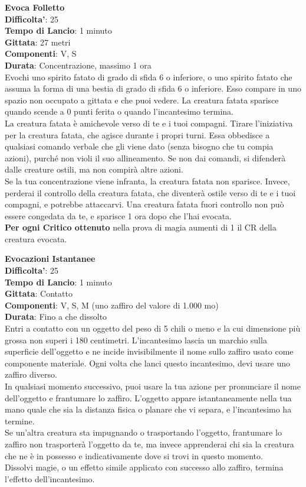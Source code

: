 \begin{multicols}{2}
\medskip\textbf{Evoca Folletto}\\
\textbf{Difficolta'}: 25\\
\textbf{Tempo di Lancio}: 1 minuto\\
\textbf{Gittata}: 27 metri\\
\textbf{Componenti}: V, S\\
\textbf{Durata}: Concentrazione, massimo 1 ora \\
Evochi uno spirito fatato di grado di sfida 6 o inferiore, o uno spirito fatato che assuma la forma di una bestia di grado di sfida 6 o inferiore. Esso compare in uno spazio non occupato a gittata e che puoi vedere. La creatura fatata sparisce quando scende a 0 punti ferita o quando l’incantesimo termina.\\
La creatura fatata è amichevole verso di te e i tuoi compagni. Tirare l’iniziativa per la creatura fatata, che agisce durante i propri turni. Essa obbedisce a qualsiasi comando verbale che gli viene dato (senza bisogno che tu compia azioni), purché non violi il suo allineamento. Se non dai comandi, si difenderà dalle creature ostili, ma non compirà altre azioni.\\
Se la tua concentrazione viene infranta, la creatura fatata non sparisce. Invece, perderai il controllo della creatura fatata, che diventerà ostile verso di te e i tuoi compagni, e potrebbe attaccarvi. Una creatura fatata fuori controllo non può essere congedata da te, e sparisce 1 ora dopo che l’hai evocata.\\
\textbf{Per ogni Critico ottenuto} nella prova di magia aumenti di 1 il CR della creatura evocata.

\medskip\textbf{Evocazioni Istantanee}\\
\textbf{Difficolta'}: 25\\
\textbf{Tempo di Lancio}: 1 minuto\\
\textbf{Gittata}: Contatto\\
\textbf{Componenti}: V, S, M (uno zaffiro del valore di 1.000 mo)\\
\textbf{Durata}: Fino a che dissolto \\
Entri a contatto con un oggetto del peso di 5 chili o meno e la cui dimensione più grossa non superi i 180 centimetri. L’incantesimo lascia un marchio sulla superficie dell’oggetto e ne incide invisibilmente il nome sullo zaffiro usato come componente materiale. Ogni volta che lanci questo incantesimo, devi usare uno zaffiro diverso.\\
In qualsiasi momento successivo, puoi usare la tua azione per pronunciare il nome dell’oggetto e frantumare lo zaffiro. L’oggetto appare istantaneamente nella tua mano quale che sia la distanza fisica o planare che vi separa, e l’incantesimo ha termine.\\
Se un’altra creatura sta impugnando o trasportando l’oggetto, frantumare lo zaffiro non trasporterà l’oggetto da te, ma invece apprenderai chi sia la creatura che ne è in possesso e indicativamente dove si trovi in questo momento.\\
Dissolvi magie, o un effetto simile applicato con successo allo zaffiro, termina l’effetto dell’incantesimo. 


\end{multicols}
